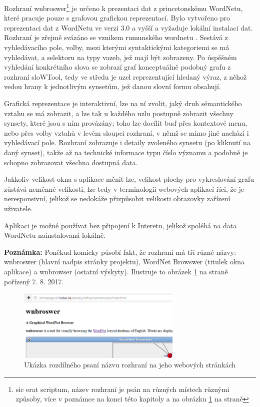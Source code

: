 \documentclass[a4paper, 11pt, oneside]{book}
\begin{document}
					Rozhraní wnbroswer\footnote{sic erat scriptum, název rozhraní je psán na různých místech různými způsoby, více v poznámce na konci této kapitoly a na obrázku \ref{fig:wnbroswerbadwriting} na straně \pageref{fig:wnbroswerbadwriting}} je určeno k prezentaci dat z princetonskému WordNetu, které pracuje pouze s grafovou grafickou reprezentací. Bylo vytvořeno pro reprezentaci dat z WordNetu ve verzi 3.0 a vyšší a vyžaduje lokální instalaci dat. Rozhraní je zřejmě svázáno se vznikem rumunského wordnetu \parencite{fivser2011visualizing}. Sestává z vyhledávacího pole, volby, mezi kterými syntaktickými kategoriemi se má vyhledávat, a selektoru na typy vazeb, jež mají být zobrazeny. Po úspěšném vyhledání konkrétního slova se zobrazí graf konceptuálně podobný grafu z rozhraní sloWTool, tedy ve středu je uzel reprezentující hledaný výraz, z něhož vedou hrany k jednotlivým synsetům, jež danou slovní formu obsahují. 

					Grafická reprezentace je interaktivní, lze na ní zvolit, jaký druh sémantického vztahu se má zobrazit, a lze tak u každého uzlu postupně zobrazit všechny synsety, které jsou s ním provázány; toho lze docílit buď přes kontextové menu, nebo přes volby vztahů v levém sloupci rozhraní, v němž se mimo jiné nachází i vyhledávací pole. Rozhraní zobrazuje i detaily zvoleného synsetu (po kliknutí na daný synset), takže až na technické informace typu číslo významu a podobně je schopno zobrazovat všechna dostupná data.

					Jakkoliv velikost okna s aplikace měnit lze, velikost plochy pro vykreslování grafu zůstává neměnné velikosti, lze tedy v terminologii webových aplikací říci, že je neresponsivní, jelikož se nedokáže přizpůsobit velikosti obrazovky zařízení uživatele.

					Aplikaci je možné používat bez připojení k Interetu, jelikož spoléhá na data WordNetu nainstalovaná lokálně. 

					\textbf{Poznámka:} Poněkud komicky působí fakt, že rozhraní má tři různé názvy: wnbroswer (hlavní nadpis stránky projektu), WordNet Browswer (titulek okna aplikace) a wnbrowser (ostatní výskyty). Ilustruje to obrázek \ref{fig:wnbroswerbadwriting} na straně \pageref{fig:wnbroswerbadwriting} pořízený 7. 8. 2017.

					\begin{figure}[h]
						\centering
						\includegraphics[width=0.7\textwidth]{wnbroswer.png}
						\caption{Ukázka rozdílného psaní názvu rozhraní na jeho webových stránkách}
						\label{fig:wnbroswerbadwriting}
					\end{figure}
\end{document}
